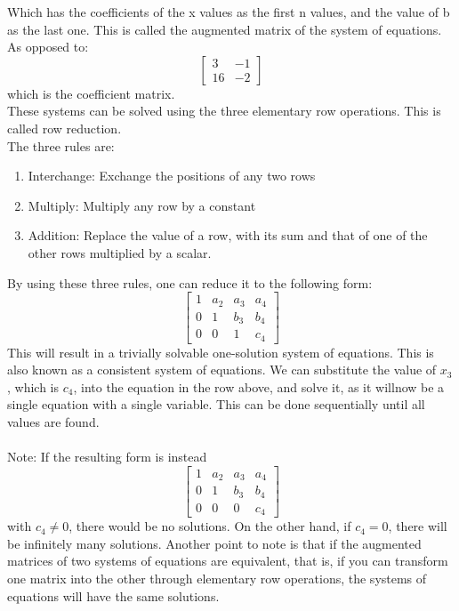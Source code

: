 \documentclass[nobib]{tufte-handout}
\begin{document}
Which has the coefficients of the x values as the first n values, and the value of b as the last one. This is called the augmented matrix of the system of equations. As opposed to:
\begin{equation*}
  \begin{bmatrix}
    3 & -1\\
    16 & -2
 \end{bmatrix}  
\end{equation*}
which is the coefficient matrix.\\
These systems can be solved using the three elementary row operations. This is called row reduction.\\
The three rules are:
\begin{enumerate}
    \item Interchange: Exchange the positions of any two rows
    \item Multiply: Multiply any row by a constant
    \item Addition: Replace the value of a row, with its sum and that of one of the other rows multiplied by a scalar.
\end{enumerate}
By using these three rules, one can reduce it to the following form:
\begin{equation*}
  \begin{bmatrix}
    1 & a_2 & a_3 & a_4\\
    0 & 1 & b_3 & b_4 \\
    0 & 0 & 1 & c_4
 \end{bmatrix}  
\end{equation*}
This will result in a trivially solvable one-solution system of equations. This is also known as a consistent system of equations. We can substitute the value of $x_3$, which is $c_4$, into the equation in the row above, and solve it, as it willnow be a single equation with a single variable. This can be done sequentially until all values are found.\\~\\
Note: If the resulting form is instead
\begin{equation*}
  \begin{bmatrix}
    1 & a_2 & a_3 & a_4\\
    0 & 1 & b_3 & b_4 \\
    0 & 0 & 0 & c_4
 \end{bmatrix}  
\end{equation*}
with $c_4 \neq 0$, there would be no solutions. On the other hand, if $c_4 = 0$, there will be infinitely many solutions.
Another point to note is that if the augmented matrices of two systems of equations are equivalent,
that is, if you can transform one matrix into the other through elementary row operations, the systems of equations will have the same solutions.
\pagebreak
\end{document}

